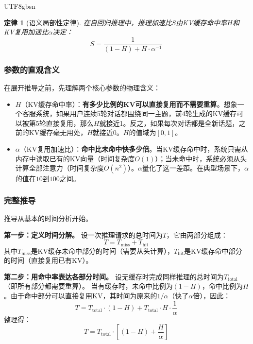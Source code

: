 \documentclass[11pt,a4paper]{article}
\newtheorem{law}{定律}[section]
\begin{document}
\begin{CJK*}{UTF8}{gbsn}
\begin{law}[语义局部性定律]
在自回归推理中，推理加速比$S$由KV缓存命中率$H$和KV复用加速比$\alpha$决定：
\begin{equation}
\label{eq:locality}
S = \frac{1}{(1-H) + H \cdot \alpha^{-1}}
\end{equation}
\end{law}

\subsubsection{参数的直观含义}

在展开推导之前，先理解两个核心参数的物理含义：

\begin{itemize}[nosep]
\item $H$（KV缓存命中率）：\textbf{有多少比例的KV可以直接复用而不需要重算}。想象一个客服系统，如果用户连续5轮对话都围绕同一主题，前4轮生成的KV缓存可以被第5轮直接复用，那么$H$就接近1。反之，如果每次对话都是全新话题，之前的KV缓存毫无用处，$H$就接近0。$H$的值域为$[0, 1]$。
\item $\alpha$（KV复用加速比）：\textbf{命中比未命中快多少倍}。当KV缓存命中时，系统只需从内存中读取已有的KV向量（时间复杂度$O(1)$）；当未命中时，系统必须从头计算全部注意力（时间复杂度$O(n^2)$）。$\alpha$量化了这一差距。在典型场景下，$\alpha$的值在$10$到$100$之间。
\end{itemize}

\subsubsection{完整推导}

推导从基本的时间分析开始。

\textbf{第一步：定义时间分解。}
设一次推理请求的总时间为$T$，它由两部分组成：
\begin{equation}
T = T_{\mathrm{miss}} + T_{\mathrm{hit}}
\end{equation}
其中$T_{\mathrm{miss}}$是KV缓存未命中部分的时间（需要从头计算），$T_{\mathrm{hit}}$是KV缓存命中部分的时间（直接复用已有KV）。

\textbf{第二步：用命中率表达各部分时间。}
设无缓存时完成同样推理的总时间为$T_{\mathrm{total}}$（即所有部分都需要重算）。
当有缓存时，未命中比例为$(1-H)$，命中比例为$H$。由于命中部分可以直接复用KV，其时间为原来的$1/\alpha$（快了$\alpha$倍），因此：
\begin{equation}
T = T_{\mathrm{total}} \cdot (1-H) + T_{\mathrm{total}} \cdot H \cdot \frac{1}{\alpha}
\end{equation}
整理得：
\begin{equation}
T = T_{\mathrm{total}} \cdot \left[(1-H) + \frac{H}{\alpha}\right]
\end{equation}


\end{CJK*}
\end{document}
